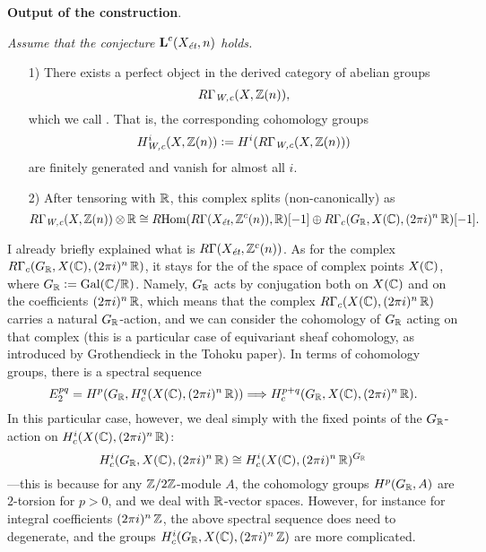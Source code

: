 \documentclass{article}
\theoremstyle{plain}
\begin{document}
\vspace{1em}

\noindent\textbf{Output of the construction}.
{\it Assume that the conjecture $\textbf{L}^c (X_\text{\it ét}, n)$ holds.

\begin{enumerate}
\item[1)] There exists a perfect object in the derived category of abelian
  groups
  $$R\Gamma_\text{\it W,c} (X, \mathbb{Z} (n)),$$
  which we call . That is, the
  corresponding cohomology groups
  $$H^i_\text{\it W,c} (X, \mathbb{Z} (n)) \mathrel{\mathop:}= H^i (R\Gamma_\text{\it W,c} (X, \mathbb{Z} (n)))$$
  are finitely generated and vanish for almost all $i$.

\item[2)] After tensoring with $\mathbb{R}$, this complex splits (non-canonically) as
  \[
    R\Gamma_\text{\it W,c} (X,\mathbb{Z}(n)) \otimes \mathbb{R} \cong
    R\!\operatorname{Hom} (R\Gamma (X_\text{\it ét}, \mathbb{Z}^c (n)), \mathbb{R}) [-1]
    \oplus
    R\Gamma_c (G_{\mathbb{R}}, X (\mathbb{C}), (2\pi i)^n\,\mathbb{R}) [-1].
  \]
\end{enumerate}}

\vspace{1em}

I already briefly explained what is $R\Gamma (X_\text{\it ét}, \mathbb{Z}^c (n))$.
As for the complex $R\Gamma_c (G_{\mathbb{R}}, X (\mathbb{C}), (2\pi i)^n\,\mathbb{R})$, it stays for
the  of the space of
complex points $X (\mathbb{C})$, where $G_{\mathbb{R}} \mathrel{\mathop:}= \operatorname{Gal} (\mathbb{C}/\mathbb{R})$. Namely, $G_{\mathbb{R}}$
acts by conjugation both on $X (\mathbb{C})$ and on the coefficients $(2\pi i)^n\,\mathbb{R}$,
which means that the complex $R\Gamma_c (X (\mathbb{C}), (2\pi i)^n\,\mathbb{R})$ carries a
natural $G_{\mathbb{R}}$-action, and we can consider the cohomology of $G_{\mathbb{R}}$ acting on
that complex (this is a particular case of equivariant sheaf cohomology, as
introduced by Grothendieck in the Tohoku paper). In terms of cohomology groups,
there is a spectral sequence
$$E_2^{pq} = H^p (G_{\mathbb{R}}, H^q_c (X (\mathbb{C}), (2\pi i)^n\,\mathbb{R})) \Longrightarrow H^{p+q}_c (G_{\mathbb{R}}, X (\mathbb{C}), (2\pi i)^n\,\mathbb{R}).$$
In this particular case, however, we deal simply with the fixed points of the
$G_{\mathbb{R}}$-action on $H_c^i (X (\mathbb{C}), (2\pi i)^n\,\mathbb{R})$:
$$H_c^i (G_{\mathbb{R}}, X (\mathbb{C}), (2\pi i)^n\,\mathbb{R}) \cong H_c^i (X (\mathbb{C}), (2\pi i)^n\,\mathbb{R})^{G_{\mathbb{R}}}$$
---this is because for any $\mathbb{Z}/2\mathbb{Z}$-module $A$, the cohomology groups
$H^p (G_{\mathbb{R}}, A)$ are $2$-torsion for $p > 0$, and we deal with $\mathbb{R}$-vector
spaces. However, for instance for integral coefficients $(2\pi i)^n\,\mathbb{Z}$,
the above spectral sequence does need to degenerate, and the groups
$H_c^i (G_{\mathbb{R}}, X (\mathbb{C}), (2\pi i)^n\,\mathbb{Z})$ are more complicated.
\end{document}
